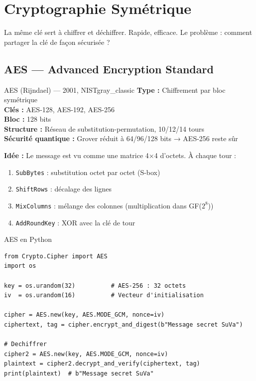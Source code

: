 \documentclass[12pt, a4paper]{article}
\begin{document}
\section{Cryptographie Symétrique}

La même clé sert à chiffrer et déchiffrer. Rapide, efficace. Le problème : comment
partager la clé de façon sécurisée ?

\subsection{AES --- Advanced Encryption Standard}

\begin{algobox}{AES (Rijndael) --- 2001, NIST}{gray_classic}
\textbf{Type :} Chiffrement par bloc symétrique\\
\textbf{Clés :} AES-128, AES-192, AES-256\\
\textbf{Bloc :} 128 bits\\
\textbf{Structure :} Réseau de substitution-permutation, 10/12/14 tours\\
\textbf{Sécurité quantique :} Grover réduit à 64/96/128 bits → AES-256 reste sûr
\end{algobox}

\textbf{Idée :} Le message est vu comme une matrice 4×4 d'octets. À chaque tour :
\begin{enumerate}
  \item \texttt{SubBytes} : substitution octet par octet (S-box)
  \item \texttt{ShiftRows} : décalage des lignes
  \item \texttt{MixColumns} : mélange des colonnes (multiplication dans GF($2^8$))
  \item \texttt{AddRoundKey} : XOR avec la clé de tour
\end{enumerate}

\begin{pratique}{AES en Python}
\begin{lstlisting}[style=python]
from Crypto.Cipher import AES
import os

key = os.urandom(32)          # AES-256 : 32 octets
iv  = os.urandom(16)          # Vecteur d'initialisation

cipher = AES.new(key, AES.MODE_GCM, nonce=iv)
ciphertext, tag = cipher.encrypt_and_digest(b"Message secret SuVa")

# Dechiffrer
cipher2 = AES.new(key, AES.MODE_GCM, nonce=iv)
plaintext = cipher2.decrypt_and_verify(ciphertext, tag)
print(plaintext)  # b"Message secret SuVa"
\end{lstlisting}
\end{pratique}
\end{document}
